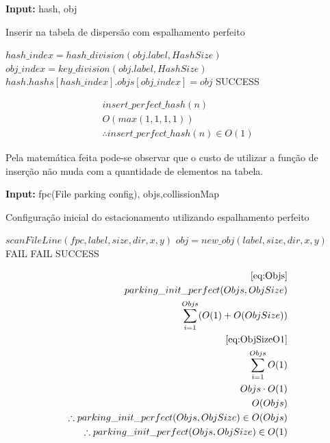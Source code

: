 \documentclass[11pt]{article}
\begin{document}
\begin{algorithm}
\textbf{Input:} hash, obj
\caption{Inserir na tabela de dispersão com espalhamento perfeito}\label{algorithmdpsmudar}
\begin{algorithmic}[1]
\State $hash\_index = hash\_division(obj.label,HashSize)$
\State $obj\_index = key\_division(obj.label,HashSize)$
\State $hash.hashs[hash\_index].objs[obj\_index] = obj$
\State \Return SUCCESS
\EndProcedure
\end{algorithmic}
\end{algorithm}

\begin{equation}
\begin{aligned}
insert\_perfect\_hash(n)\\
O(max(1,1,1,1))\\
\therefore insert\_perfect\_hash(n) \in O(1)
\end{aligned}
\end{equation}

Pela matemática feita pode-se observar que o custo de utilizar a função de inserção não muda com a quantidade de elementos na tabela.

\begin{algorithm}
\textbf{Input:} fpc(File parking config), objs,collissionMap
\caption{Configuração inicial do estacionamento utilizando espalhamento perfeito}\label{algorithmdpsmudar}
\begin{algorithmic}[1]
\State $scanFileLine(fpc,label,size,dir,x,y)$
\State $obj = new\_obj(label,size,dir,x,y)$
\State \Return FAIL
\EndIf
{}
\State \Return FAIL
\EndIf
\EndWhile
\State \Return SUCCESS
\EndProcedure
\end{algorithmic}
\end{algorithm}

\begin{equation}
\begin{aligned}
\eqref{eq:Objs}\\
parking\_init\_perfect(Objs,ObjSize)\\
\sum_{i=1}^{Objs} (O(1)+O(ObjSize))\\
\eqref{eq:ObjSizeO1}\\
\sum_{i=1}^{Objs} O(1)\\
Objs\cdot O(1)\\
O(Objs)\\
\therefore parking\_init\_perfect(Objs,ObjSize)\in O(Objs)\\
\therefore parking\_init\_perfect(Objs,ObjSize)\in O(1)\\
\end{aligned}
\end{equation}
\end{document}
